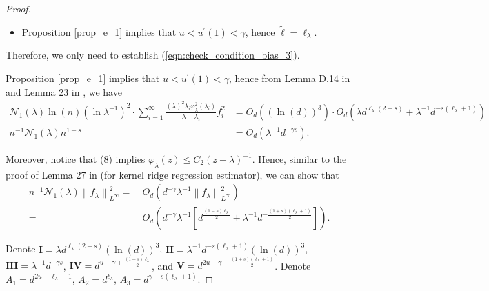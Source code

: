 \documentclass{article}
\theoremstyle{plain}
\theoremstyle{definition}
\theoremstyle{remark}
\newcommand{\reg}{\varphi_\lambda}
\begin{document}
\begin{appendix}
\begin{proof}
\begin{itemize}
        \item Proposition \ref{prop_e_1} implies that $u < u^{\prime}(1) < \gamma$, hence $\tilde{\ell}=\ell_{\lambda}$.

        \fi
    \end{itemize}


Therefore, we only need to establish (\ref{eqn:check_condition_bias_3}). 


Proposition \ref{prop_e_1} implies that $u < u^{\prime}(1) < \gamma$, hence from Lemma D.14 in \cite{lu2024saturation} and Lemma 23 in \cite{zhang2024optimal}, we have
    \begin{align*}
        \mathcal{N}_{1}(\lambda) \ln(n) (\ln\lambda^{-1})^2 \cdot \sum_{i=1}^\infty \frac{(\lambda)^2 \lambda_i \varphi_{\lambda}^2(\lambda_i)}{\lambda + \lambda_i} f_i^2
        &=
        O_{d}\left((\ln(d))^3 \right)
    \cdot
    O_{d}\left(
        \lambda d^{\ell_{\lambda}(2-s)} + \lambda^{-1}d^{-s(\ell_{\lambda}+1)}
    \right)\\
    n^{-1} \mathcal{N}_{1}(\lambda) 
    n^{1-s}
        &=
        O_{d}\left(
        \lambda^{-1} 
         d^{-\gamma s}
        \right).
    \end{align*}

Moreover, notice that (8) implies $\reg(z) \leq C_2 (z+\lambda)^{-1}$. Hence, similar to the proof of Lemma 27 in \cite{zhang2024optimal} (for kernel ridge regression estimator), we can show that
\begin{align*}
    n^{-1} \mathcal{N}_{1}(\lambda)\left\| f_{\lambda} \right\|_{L^{\infty}}^2 =&~ O_{d}\left(
   d^{-\gamma} \lambda^{-1}  \left\| f_{\lambda} \right\|_{L^{\infty}}^2    \right)\\
   =&~ O_{d}\left(
   d^{-\gamma} \lambda^{-1}  \left[ d^{\frac{(1-s)\ell_{\lambda}}{2}} + \lambda^{-1} d^{-\frac{(1+s)(\ell_{\lambda}+1)}{2}} \right]    \right).
\end{align*}




    

Denote $\mathbf{I}=\lambda d^{\ell_{\lambda}(2-s)} (\ln(d))^3$,
$\mathbf{II}=\lambda^{-1}d^{-s(\ell_{\lambda}+1)}(\ln(d))^3$,  
$\mathbf{III}=\lambda^{-1} 
         d^{-\gamma s}$, 
$\mathbf{IV}= 
         d^{u-\gamma + \frac{(1-s)\ell_{\lambda}}{2}}$,
and $\mathbf{V}= 
         d^{2u-\gamma -\frac{(1+s)(\ell_{\lambda}+1)}{2}}$.     
Denote $A_1 = d^{2u-\ell_{\lambda}-1}$, $A_2 = d^{\ell_{\lambda}}$, $A_3 = d^{\gamma-s(\ell_{\lambda}+1)}$.


\end{proof}
\end{appendix}
\end{document}

